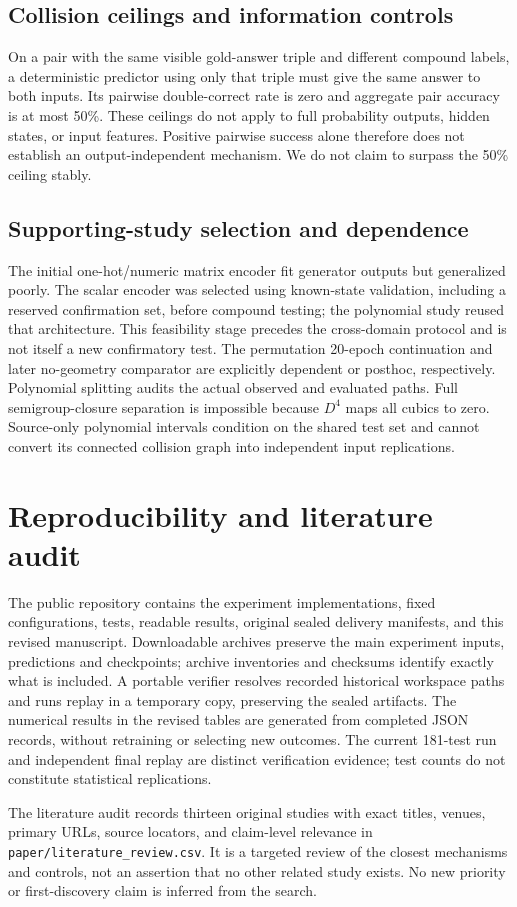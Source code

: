 \subsection{Collision ceilings and information controls}
On a pair with the same visible gold-answer triple and different compound labels, a deterministic predictor using only that triple must give the same answer to both inputs. Its pairwise double-correct rate is zero and aggregate pair accuracy is at most 50\%.
These ceilings do not apply to full probability outputs, hidden states, or input features. Positive pairwise success alone therefore does not establish an output-independent mechanism. We do not claim to surpass the 50\% ceiling stably.

\subsection{Supporting-study selection and dependence}
The initial one-hot/numeric matrix encoder fit generator outputs but generalized poorly. The scalar encoder was selected using known-state validation, including a reserved confirmation set, before compound testing; the polynomial study reused that architecture.
This feasibility stage precedes the cross-domain protocol and is not itself a new confirmatory test.
The permutation 20-epoch continuation and later no-geometry comparator are explicitly dependent or posthoc, respectively.
Polynomial splitting audits the actual observed and evaluated paths. Full semigroup-closure separation is impossible because $D^4$ maps all cubics to zero.
Source-only polynomial intervals condition on the shared test set and cannot convert its connected collision graph into independent input replications.

\section{Reproducibility and literature audit}
The public repository contains the experiment implementations, fixed configurations, tests, readable results, original sealed delivery manifests, and this revised manuscript.
Downloadable archives preserve the main experiment inputs, predictions and checkpoints; archive inventories and checksums identify exactly what is included.
A portable verifier resolves recorded historical workspace paths and runs replay in a temporary copy, preserving the sealed artifacts.
The numerical results in the revised tables are generated from completed JSON records, without retraining or selecting new outcomes.
The current 181-test run and independent final replay are distinct verification evidence; test counts do not constitute statistical replications.

The literature audit records thirteen original studies with exact titles, venues, primary URLs, source locators, and claim-level relevance in \texttt{paper/literature\_review.csv}.
It is a targeted review of the closest mechanisms and controls, not an assertion that no other related study exists.
No new priority or first-discovery claim is inferred from the search.
